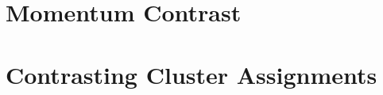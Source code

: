 \documentclass[../main.tex]{subfiles}
\begin{document}
\section{Momentum Contrast}

\section{Contrasting Cluster Assignments}
\end{document}
